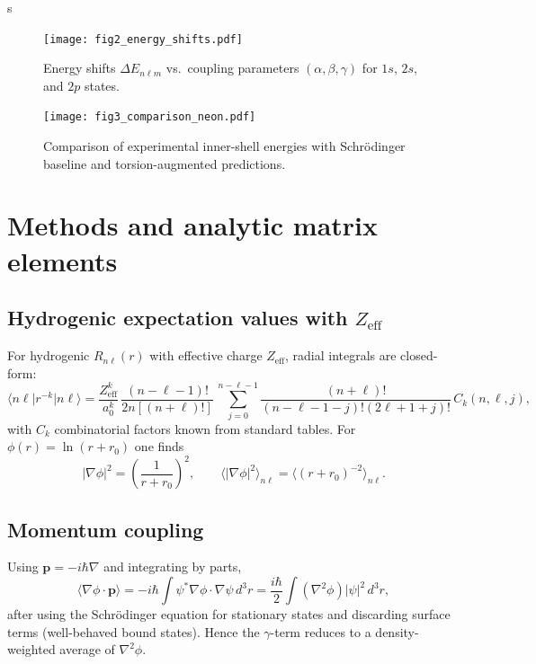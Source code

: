 s\documentclass[12pt]{article}
\begin{document}
\begin{figure}[h]
\centering
\texttt{[image: fig2\_energy\_shifts.pdf]}
\caption{Energy shifts $\Delta E_{n\ell m}$ vs.\ coupling parameters $(\alpha,\beta,\gamma)$ for $1s$, $2s$, and $2p$ states.}
\end{figure}

\begin{figure}[h]
\centering
\texttt{[image: fig3\_comparison\_neon.pdf]}
\caption{Comparison of experimental inner-shell energies with Schrödinger baseline and torsion-augmented predictions.}
\end{figure}

\clearpage
\appendix
\section{Methods and analytic matrix elements}
\label{sec:methods}
\subsection{Hydrogenic expectation values with $Z_{\mathrm{eff}}$}
For hydrogenic $R_{n\ell}(r)$ with effective charge $Z_{\mathrm{eff}}$, radial integrals are closed-form:
\begin{equation}
\big\langle n\ell \big| r^{-k} \big| n\ell \big\rangle
= \frac{Z_{\mathrm{eff}}^k}{a_0^k}\,\frac{(n-\ell-1)!}{2n[(n+\ell)!]}\, \sum_{j=0}^{n-\ell-1} \frac{(n+\ell)!}{(n-\ell-1-j)!(2\ell+1+j)!}\, C_{k}(n,\ell,j),
\end{equation}
with $C_k$ combinatorial factors known from standard tables.\cite{BetheSalpeter} For $\phi(r)=\ln(r+r_0)$ one finds
\begin{equation}
|\nabla \phi|^2 = \left(\frac{1}{r+r_0}\right)^2, \qquad
\big\langle |\nabla \phi|^2 \big\rangle_{n\ell} = \big\langle (r+r_0)^{-2} \big\rangle_{n\ell}.
\end{equation}

\subsection{Momentum coupling}
Using $\bm{p}=-i\hbar \nabla$ and integrating by parts,
\begin{equation}
\big\langle \nabla \phi \cdot \bm{p} \big\rangle
= -i\hbar \int \psi^\ast \nabla \phi \cdot \nabla \psi \, d^3r
= \frac{i\hbar}{2} \int (\nabla^2 \phi) |\psi|^2 \, d^3r,
\end{equation}
after using the Schrödinger equation for stationary states and discarding surface terms (well-behaved bound states). Hence the $\gamma$-term reduces to a density-weighted average of $\nabla^2 \phi$.
\end{document}
